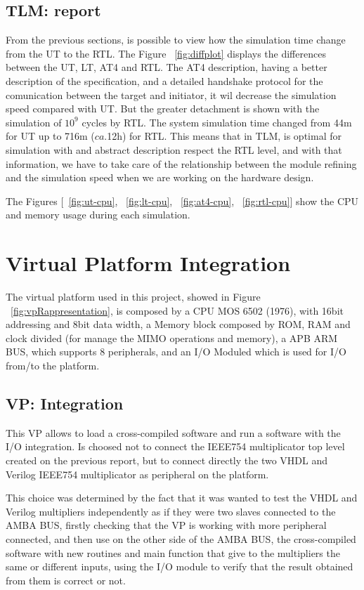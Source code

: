 \documentclass[]{IEEEtran}
\begin{document}
\subsection{TLM:  report}
\label{sec:ltmreport}
From the previous sections, is possible to view how the simulation time change from the UT to the RTL. The Figure ~\ref{fig:diffplot} displays the differences between the UT, LT, AT4 and RTL. The AT4 description, having a better description of the specification, and a detailed handshake protocol for the comunication between the target and initiator, it wil decrease the simulation speed compared with UT. But the greater detachment is shown with the simulation of $10^9$ cycles by RTL. 
The system simulation time changed from 44m for UT up to 716m ($ca.$12h) for RTL. This means that in TLM, is optimal for simulation with and abstract description respect the RTL level, and with that information, we have to take care of the relationship between the module refining and the simulation speed when we are working on the hardware design.

The Figures [~\ref{fig:ut-cpu}, ~\ref{fig:lt-cpu}, ~\ref{fig:at4-cpu}, ~\ref{fig:rtl-cpu}] show the CPU and memory usage during each simulation.

\section{Virtual Platform Integration}
\label{sec:vp}
The virtual platform used in this project, showed in Figure ~\ref{fig:vpRappresentation}, is composed by a CPU MOS 6502 (1976), with 16bit addressing and 8bit data width, a Memory block composed by ROM, RAM and clock divided (for manage the MIMO operations and memory), a APB ARM BUS, which supports 8 peripherals, and an I/O Moduled which is used for I/O from/to the platform.

\subsection{VP: Integration}
\label{sec:vpintegration}
This VP allows to load a cross-compiled software and run a software with the I/O integration. Is choosed not to connect the IEEE754 multiplicator top level created on the previous report, but to connect directly the two  VHDL and Verilog IEEE754 multiplicator as peripheral on the platform. 

This choice was determined by the fact that it was wanted to test the VHDL and Verilog multipliers independently as if they were two slaves connected to the AMBA BUS, firstly checking that the VP is working with more peripheral connected, and then use on the other side of the AMBA BUS, the cross-compiled software with new routines and main function that give to the multipliers the same or different inputs, using the I/O module to verify that the result obtained from them is correct or not. 
\end{document}
